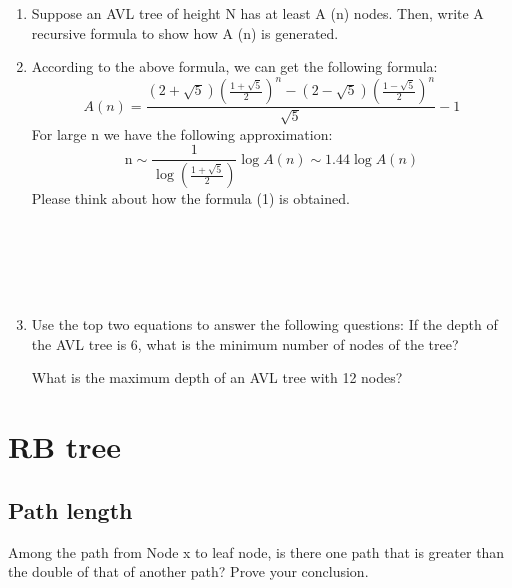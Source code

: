 \documentclass[11pt]{exam}
\begin{document}
\begin{enumerate}
\begin{solution}
\end{solution}
\item Suppose an AVL tree of height N has at least A (n) nodes. 
Then, write A recursive formula to show how A (n) is generated.
\begin{solution}

\end{solution}
\item According to the above formula, we can get the following formula:
\begin{equation}
    A(n)=\frac{(2+\sqrt{5})\left(\frac{1+\sqrt{5}}{2}\right)^{n}-(2-\sqrt{5})\left(\frac{1-\sqrt{5}}{2}\right)^{n}}{\sqrt{5}}-1
\end{equation}
For large n we have the following approximation:
\begin{equation}
    \mathrm{n} \sim \frac{1}{\log \left(\frac{1+\sqrt{5}}{2}\right)} \log A(n) \sim 1.44 \log A(n)
\end{equation}
Please think about how the formula (1) is obtained.
\begin{solution}
    \\ \hspace*{\fill} \\
    \\ \hspace*{\fill} \\
\end{solution}
\item Use the top two equations to answer the following questions:
If the depth of the AVL tree is 6, what is the minimum number of nodes of the tree?
\begin{solution}
    
\end{solution}
What is the maximum depth of an AVL tree with 12 nodes?
\begin{solution}
   
\end{solution}
\end{enumerate}
\section{RB tree}
\subsection{Path length}
Among the path from Node x to leaf node, is there one path that is greater than the double of that of another path? Prove your conclusion.
\begin{solution}
    \\ \hspace*{\fill} \\
    \\ \hspace*{\fill} \\

\end{solution}
   
\end{document}

